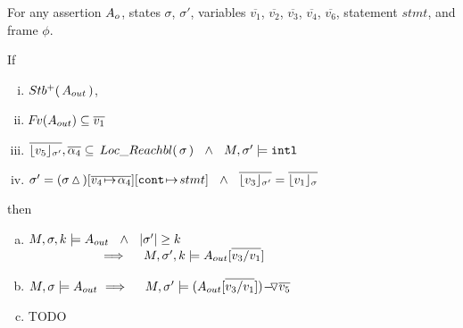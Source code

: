 \begin{lemma}
\label{l:calls:return}

For any assertion $\Ao$, states $\sigma$, $\sigma'$,  
variables  $\overline{v_1}$,    $\overline{v_2}$,  $\overline{v_3}$,  $\overline{v_4}$,  $\overline{v_6}$,  %
statement $stmt$, and frame $\phi$.

\noindent
 If 
 
\begin{enumerate}[(i)]
\item 
\label{l:calls:r:one}
$ \Pos \Aout$,  
\item 
\label{l:callers:r:two}
$\fv(\Aout) \subseteq  \overline{v_1} $
\item
$  \overline {\interpret {\sigma'} {v_5}}, \overline {\alpha_4} \subseteq \LRelevantO \sigma  \ \ \wedge \ \  M, \sigma' \models \intThis$
 \item
\label{l:callers:three}
$\sigma'= (\sigma \popSymbol)[\overline{ v_4\! \mapsto\! \alpha_4}][\prg{cont}\!\mapsto\! stmt]
\ \ \wedge \ \   \overline {\interpret {\sigma'}  {v_3} } = \overline {\interpret {\sigma} {v_1} }$ 
  \end{enumerate}
  
\noindent
then


\begin{enumerate}[(a)]
\item
\label{l:calls:caller:one}
$\satDAssertFrom M  \sigma k   \Aout  \ \  \wedge\ \ \DepthSt {\sigma'} \geq k  \ 
$ \\ 
$\strut \hspace{2cm}  \hfill \Longrightarrow  \ \ \  \   \satDAssertFrom M  {\sigma'} k   {\Aout[\overline {v_3 / v_1}]  }$ 

 
 \item
 \label{l:calls:caller:two}
 $M, \sigma \models  {\Aout}\ %
 \hfill \Longrightarrow  \ \ \  \  M , \sigma' \models  {\PushASLong  {\overline {v_5}}    {(\Aout[\overline { v_3/v_1}])} }$
%
%
 \item
 \label{l:calls:caller:three}
 TODO

\end{enumerate}

\end{lemma}



